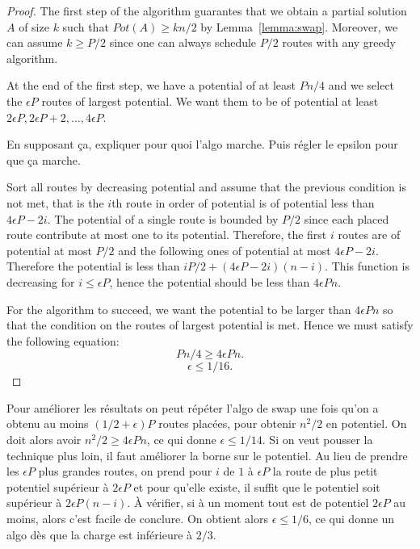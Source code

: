 \documentclass[10pt, conference, letterpaper]{IEEEtran}
\begin{document}
\begin{proof}
 The first step of the algorithm guarantes that we obtain a partial solution 
 $A$ of size $k$ such that $Pot(A) \geq kn/2$ by Lemma~\ref{lemma:swap}. 
Moreover, we can assume $k \geq P/2$ since one can always schedule $P/2$ routes with any greedy algorithm.
 
At the end of the first step, we have a potential of at least $Pn/4$ and we select the $\epsilon P$ routes of largest potential. We want them to be of potential at least $2\epsilon P, 2\epsilon P +2,\dots ,4\epsilon P$. 

En supposant ça, expliquer pour quoi l'algo marche. 
Puis régler le epsilon pour que ça marche.




Sort all routes by decreasing potential and assume that the previous condition is not met, that is the $i$th route in order of potential is of potential less than $4\epsilon P - 2i$. The potential of a single route is bounded by $P/2$ since each placed route contribute at most one to its potential. Therefore, the first
$i$ routes are of potential at most $P/2$ and the following ones of potential at most $4\epsilon P - 2i$. Therefore the potential is less than $iP/2 + (4\epsilon P - 2i) (n -i)$. This function is decreasing for $i \leq \epsilon P$, hence the potential should be less than $4\epsilon P n$.
 
 For the algorithm to succeed, we want the potential to be larger than $4\epsilon P n$ so that the condition on the routes of largest potential is met.
Hence we must satisfy the following equation:
 $$Pn/4 \geq 4\epsilon P n.$$
 $$ \epsilon \leq 1/16.$$
\end{proof}


Pour améliorer les résultats on peut répéter l'algo de swap une fois qu'on a obtenu 
au moins $(1/2 + \epsilon)P$ routes placées, pour obtenir $n^2/2$ en potentiel. 
On doit alors avoir $n^2/2 \geq 4\epsilon P n$, ce qui donne $\epsilon \leq 1/14$.
Si on veut pousser la technique plus loin, il faut améliorer la borne sur le potentiel.
Au lieu de prendre les $\epsilon P$ plus grandes routes, on prend pour $i$ de $1$
à $\epsilon P$ la route de plus petit potentiel supérieur à $2 \epsilon P$ et 
pour qu'elle existe, il suffit que le potentiel soit supérieur à $2\epsilon P (n -i)$.
À vérifier, si à un moment tout est de potentiel $2 \epsilon P$ au moins, alors 
c'est facile de conclure. On obtient alors $\epsilon \leq 1/6$, ce qui donne un algo
dès que la charge est inférieure à $2/3$.
\end{document}
